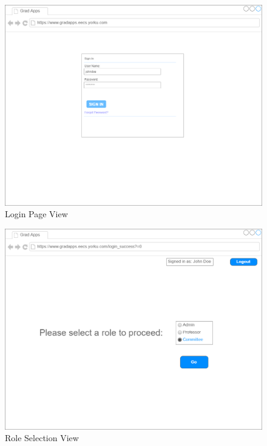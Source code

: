 \documentclass[fontsize=12pt,paper=letter,twoside]{scrartcl}
\begin{document}
\begin{figure}[!htb]
\begin{center}
\includegraphics[width=.99\textwidth]{images/login_page.png}
\end{center}
\caption{Login Page View}
\label{fig:login_page_view}
\end{figure}

\begin{figure}[!htb]
\begin{center}
\includegraphics[width=.99\textwidth]{images/role_selection.png}
\end{center}
\caption{Role Selection View}
\label{fig:role_selection_view}
\end{figure}
\end{document}
